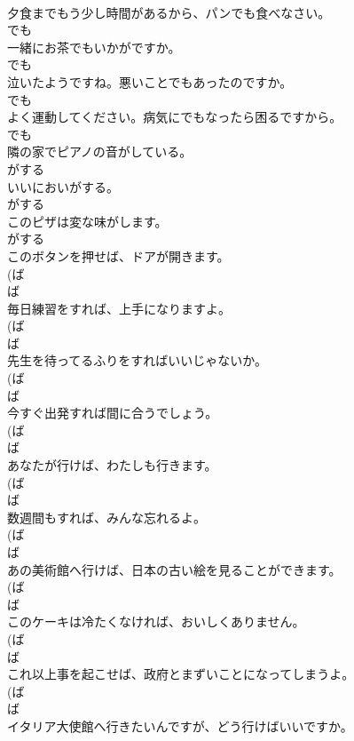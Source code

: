 \documentclass[8pt]{extreport}
\begin{document}
\begin{CJK}{UTF8}{min}
\\	夕食までもう少し時間があるから、パンでも食べなさい。	
\\	でも
\\	一緒にお茶でもいかがですか。	
\\	でも
\\	泣いたようですね。悪いことでもあったのですか。	
\\	でも
\\	よく運動してください。病気にでもなったら困るですから。	
\\	でも
\\	隣の家でピアノの音がしている。	
\\	がする
\\	いいにおいがする。	
\\	がする
\\	このピザは変な味がします。	
\\	がする
\\	このボタンを押せば、ドアが開きます。	
\\	(ば 
\\	ば
\\	毎日練習をすれば、上手になりますよ。	
\\	(ば 
\\	ば
\\	先生を待ってるふりをすればいいじゃないか。	
\\	(ば 
\\	ば
\\	今すぐ出発すれば間に合うでしょう。	
\\	(ば 
\\	ば
\\	あなたが行けば、わたしも行きます。	
\\	(ば 
\\	ば
\\	数週間もすれば、みんな忘れるよ。	
\\	(ば 
\\	ば
\\	あの美術館へ行けば、日本の古い絵を見ることができます。	
\\	(ば 
\\	ば
\\	このケーキは冷たくなければ、おいしくありません。	
\\	(ば 
\\	ば
\\	これ以上事を起こせば、政府とまずいことになってしまうよ。	
\\	(ば 
\\	ば
\\	イタリア大使館へ行きたいんですが、どう行けばいいですか。	

\end{CJK}
\end{document}
